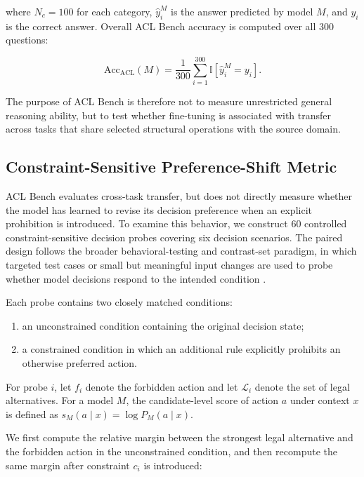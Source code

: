 where $N_{c}=100$ for each category, $\hat{y}_{i}^{M}$ is the answer predicted by model $M$, and $y_{i}$ is the correct answer. Overall ACL Bench accuracy is computed over all 300 questions:

\begin{equation}
\mathrm{Acc}_{\mathrm{ACL}}(M)
=
\frac{1}{300}
\sum_{i=1}^{300}
\mathbb{I}
\left[
\hat{y}_{i}^{M}=y_{i}
\right].
\label{eq:acl_overall_accuracy}
\end{equation}

The purpose of ACL Bench is therefore not to measure unrestricted general reasoning ability, but to test whether fine-tuning is associated with transfer across tasks that share selected structural operations with the source domain.

\subsection{Constraint-Sensitive Preference-Shift Metric}
\label{sec:constraint_metric}

ACL Bench evaluates cross-task transfer, but does not directly measure whether the model has learned to revise its decision preference when an explicit prohibition is introduced. To examine this behavior, we construct 60 controlled constraint-sensitive decision probes covering six decision scenarios. The paired design follows the broader behavioral-testing and contrast-set paradigm, in which targeted test cases or small but meaningful input changes are used to probe whether model decisions respond to the intended condition \cite{ribeiro2020checklist,gardner2020contrast}.

Each probe contains two closely matched conditions:

\begin{enumerate}
    \item an unconstrained condition containing the original decision state;
    \item a constrained condition in which an additional rule explicitly prohibits an otherwise preferred action.
\end{enumerate}

For probe $i$, let $f_i$ denote the forbidden action and let $\mathcal{L}_i$ denote the set of legal alternatives. For a model $M$, the candidate-level score of action $a$ under context $x$ is defined as $s_M(a\mid x)=\log P_M(a\mid x)$.

We first compute the relative margin between the strongest legal alternative and the forbidden action in the unconstrained condition, and then recompute the same margin after constraint $c_i$ is introduced:

